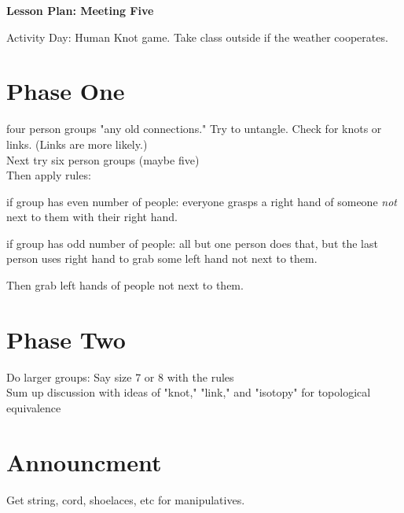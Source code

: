 \documentclass[12pt]{amsart}
\theoremstyle{definition}
\begin{document}
\begin{center}
\textbf{\Huge
Lesson Plan: Meeting Five
}
\end{center}
\vspace{.5in}

Activity Day: Human Knot game. Take class outside if the weather cooperates.

\section*{Phase One} 
four person groups "any old connections."
Try to untangle.
Check for knots or links.
(Links are more likely.)\\

Next try six person groups (maybe five)\\

Then apply rules:
\begin{compactitem}
\item if group has even number of people: everyone grasps a right hand of someone \emph{not} next to them with their right hand.
\item if group has odd number of people: all but one person does that, but the last person uses right hand to grab some left hand not next to them.
\item Then grab left hands of people not next to them.
\end{compactitem}

\section*{Phase Two} 
Do larger groups: Say size 7 or 8 with the rules \\

Sum up discussion with ideas of "knot," "link," and "isotopy" for topological equivalence


\section*{Announcment}

Get string, cord, shoelaces, etc for manipulatives.
\end{document}
